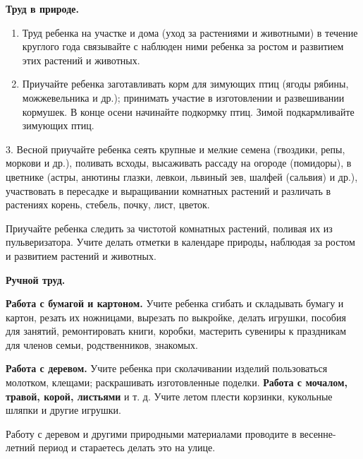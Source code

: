 \documentclass[a5paper]{book}
\begin{document}
\textbf{Труд в природе.}


\begin{enumerate}
\def\labelenumi{\arabic{enumi}.}
\item
  
  Труд ребенка на участке и дома (уход за растениями и животными) в
  течение круглого года связывайте с наблюден ними ребенка за ростом и
  развитием этих растений и животных.
  
\item
  
  Приучайте ребенка заготавливать корм для зимующих птиц (ягоды рябины,
  можжевельника и др.); принимать участие в изготовлении и развешивании
  кормушек. В конце осени начинайте подкормку птиц. Зимой подкармливайте
  зимующих птиц.
  
\end{enumerate}


3. Весной приучайте ребенка сеять крупные и мелкие семена (гвоздики,
репы, моркови и др.), поливать всходы, высаживать рассаду на огороде
(помидоры), в цветнике (астры, анютины глазки, левкои, львиный зев,
шалфей (сальвия) и др.), участвовать в пересадке и выращивании комнатных
растений и различать в растениях корень, стебель, почку, лист, цветок.

Приучайте ребенка следить за чистотой комнатных растений, поливая их из
пульверизатора. Учите делать отметки в календаре природы\textbf{,}
наблюдая за ростом и развитием растений и животных.

\textbf{Ручной труд.}

\textbf{Работа с бумагой и картоном.} Учите ребенка сгибать и складывать
бумагу и картон, резать их ножницами, вырезать по выкройке, делать
игрушки, пособия для занятий, ремонтировать книги, коробки, мастерить
сувениры к праздникам для членов семьи, родственников, знакомых.

\textbf{Работа с деревом.} Учите ребенка при сколачивании изделий
пользоваться молотком, клещами; раскрашивать изготовленные поделки.
\textbf{Работа с мочалом, травой, корой, листьями} и т. д. Учите летом
плести корзинки, кукольные шляпки и другие игрушки.

Работу с деревом и другими природными материалами проводите в
весенне-летний период и стараетесь делать это на улице.
\end{document}
